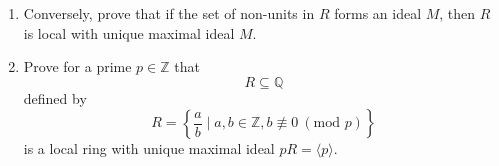 \documentclass{article}
\begin{document}
\begin{enumerate}
\begin{enumerate}
    \item Conversely, prove that if the set of non-units in $ R $ forms an ideal $ M $, then $ R $ is local with unique maximal ideal $ M $.
    
    \item Prove for a prime $ p \in \mathbb{Z} $ that 
    $$R \subseteq \mathbb{Q}$$ 
    defined by
    $$R = \left\{\frac{a}{b} \mid a,b \in \mathbb{Z}, b \not\equiv 0 \ (\text{mod } p) \right\}$$
    is a local ring with unique maximal ideal $ pR = \langle p \rangle $.
\end{enumerate}

\end{enumerate}
\end{document}
